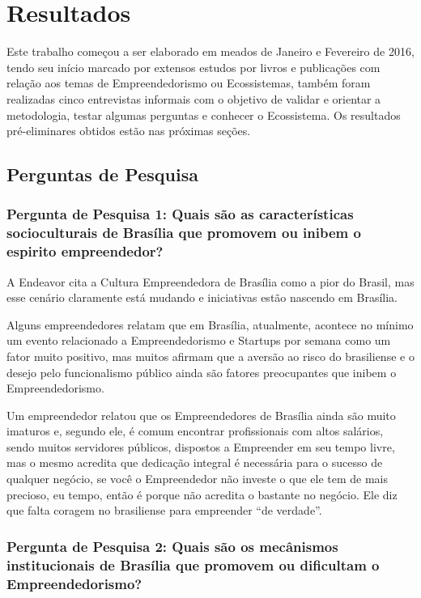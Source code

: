 \chapter[Resultados Parciais]{Resultados}
\label{cap-resultados}

Este trabalho começou a ser elaborado em meados de Janeiro e Fevereiro de 2016, tendo seu início marcado por extensos estudos por livros e publicações com relação aos temas de Empreendedorismo ou Ecossistemas, também foram realizadas cinco entrevistas informais com o objetivo de validar e orientar a metodologia, testar algumas perguntas e conhecer o Ecossistema. Os resultados pré-eliminares obtidos estão nas próximas seções.

\section{Perguntas de Pesquisa}
\label{section:perguntas_de_pesquisa}

\subsection{Pergunta de Pesquisa 1: Quais são as características socioculturais de Brasília que promovem ou inibem o espirito empreendedor?}
\label{subsection:pergunta_de_pesquisa_1}

A Endeavor cita a Cultura Empreendedora de Brasília como a pior do Brasil, mas esse cenário claramente está mudando e iniciativas estão nascendo em Brasília. 

Alguns empreendedores relatam que em Brasília, atualmente, acontece no mínimo um evento relacionado a Empreendedorismo e Startups por semana como um fator muito positivo, mas muitos afirmam que a aversão ao risco do brasiliense e o desejo pelo funcionalismo público ainda são fatores preocupantes que inibem o Empreendedorismo.

Um empreendedor relatou que os Empreendedores de Brasília ainda são muito imaturos e, segundo ele, é comum encontrar profissionais com altos salários, sendo muitos servidores públicos, dispostos a Empreender em seu tempo livre, mas o mesmo acredita que dedicação integral é necessária para o sucesso de qualquer negócio, se você o Empreendedor não investe o que ele tem de mais precioso, eu tempo, então é porque não acredita o bastante no negócio. Ele diz que falta coragem no brasiliense para empreender ``de verdade''.

\subsection{Pergunta de Pesquisa 2: Quais são os mecânismos institucionais de Brasília que promovem ou dificultam o Empreendedorismo?}
\label{subsection:pergunta_de_pesquisa_2}

